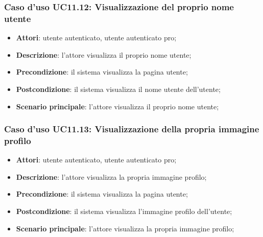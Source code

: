 \subsubsection{Caso d'uso UC11.12: Visualizzazione del proprio nome utente }
\begin{itemize}
	\item\textbf{Attori}: utente autenticato, utente autenticato pro;
	\item\textbf{Descrizione}: l'attore visualizza il proprio nome utente;
	\item\textbf{Precondizione}: il sistema visualizza la pagina utente;
	\item\textbf{Postcondizione}: il sistema visualizza il nome utente dell'utente;
	\item\textbf{Scenario principale}: l'attore visualizza il proprio nome utente;
\end{itemize}

\subsubsection{Caso d'uso UC11.13: Visualizzazione della propria immagine profilo }
\begin{itemize}
	\item\textbf{Attori}: utente autenticato, utente autenticato pro;
	\item\textbf{Descrizione}: l'attore visualizza la propria immagine profilo;
	\item\textbf{Precondizione}: il sistema visualizza la pagina utente;
	\item\textbf{Postcondizione}: il sistema visualizza l'immagine profilo dell'utente;
	\item\textbf{Scenario principale}: l'attore visualizza la propria immagine profilo;
\end{itemize}